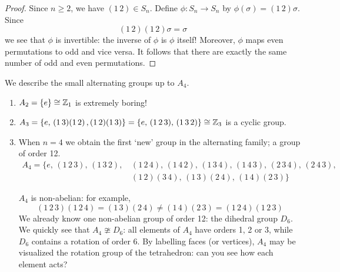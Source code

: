 \begin{proof}
Since $n\ge 2$, we have $(1\,2)\in S_n$. Define $\phi:S_n\to S_n$ by $\phi(\sigma)=(1\,2)\sigma$. Since
\[(1\,2)(1\,2)\sigma=\sigma\]
we see that $\phi$ is invertible: the inverse of $\phi$ is $\phi$ itself! Moreover, $\phi$ maps even permutations to odd and vice versa. It follows that there are exactly the same number of odd and even permutations.
\end{proof}

\begin{examples}{}{}
We describe the small alternating groups up to $A_4$.
\begin{enumerate}
  \item $A_2=\{e\}\cong \mathbb{Z}_1$ is extremely boring!
  \item $A_3=\{e,\,(1\,3)(1\,2)\,,(1\,2)(1\,3)\}=\{e,\,(1\,2\,3),\,(1\,3\,2)\}\cong\mathbb{Z}_3$ is a cyclic group.
  \item\label{pg:tetra} When $n=4$ we obtain the first `new' group in the alternating family; a group of order 12.
  \begin{align*}
  	A_4=\{e,\,(1\,2\,3),\,(1\,3\,2),\,&(1\,2\,4),\,(1\,4\,2),\,(1\,3\,4),\,(1\,4\,3),\,(2\,3\,4),\,(2\,4\,3),\\
  	&(1\,2)(3\,4),\,(1\,3)(2\,4),\,(1\,4)(2\,3)\}
  \end{align*}
  \begin{minipage}[t]{0.69\linewidth}\vspace{0pt}
    $A_4$ is non-abelian: for example,
  \[(1\,2\,3)(1\,2\,4)=(1\,3)(2\,4)\neq (1\,4)(2\,3)=(1\,2\,4)(1\,2\,3)\]
  We already know one non-abelian group of order 12: the dihedral group $D_6$. We quickly see that $A_4\ncong D_6$: all elements of $A_4$ have orders 1, 2 or 3, while $D_6$ contains a rotation of order 6.\smallbreak
  By labelling faces (or vertices), $A_4$ may be visualized the rotation group of the tetrahedron: can you see how each element acts?
  \end{minipage}\hfill\begin{minipage}[t]{0.3\linewidth}\vspace{0pt}

\end{minipage}
\end{enumerate}
\end{examples}
